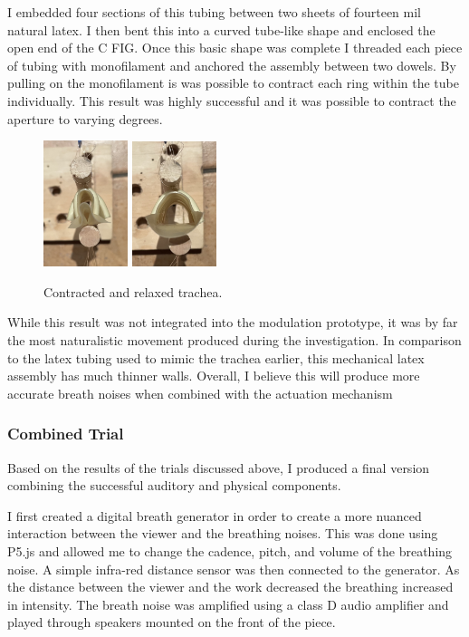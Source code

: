 \documentclass[letterpaper]{article}
\begin{document}
I embedded four sections of this tubing between two sheets of fourteen mil natural latex. I then bent this into a curved tube-like shape and enclosed the open end of the C FIG. Once this basic shape was complete I threaded each piece of tubing with monofilament and anchored the assembly between two dowels. By pulling on the monofilament is was possible to contract each ring within the tube individually. This result was highly successful and it was possible to contract the aperture to varying degrees.

\begin{figure}[h]
\centering
\includegraphics[width=0.22\textwidth]{images/46.JPG}
\includegraphics[width=0.22\textwidth]{images/52.JPG}
\caption{Contracted and relaxed trachea.}
\end{figure}

While this result was not integrated into the modulation prototype, it was by far the most naturalistic movement produced during the investigation. In comparison to the latex tubing used to mimic the trachea earlier, this mechanical latex assembly has much thinner walls. Overall, I believe this will produce more accurate breath noises when combined with the actuation mechanism

\subsubsection{Combined Trial}

Based on the results of the trials discussed above, I produced a final version combining the successful auditory and physical components.

I first created a digital breath generator in order to create a more nuanced interaction between the viewer and the breathing noises. This was done using P5.js and allowed me to change the cadence, pitch, and volume of the breathing noise. A simple infra-red distance sensor was then connected to the generator. As the distance between the viewer and the work decreased the breathing increased in intensity. The breath noise was amplified using a class D audio amplifier and played through speakers mounted on the front of the piece. 
 
\end{document}

